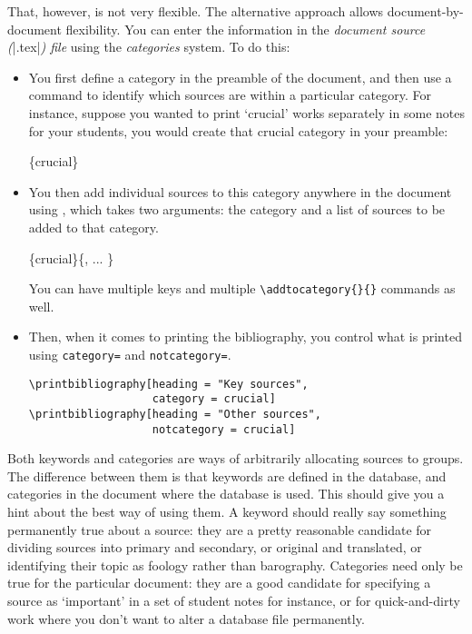That, however, is not very flexible. The alternative approach allows
document-by-document flexibility. You can enter the information in the
\emph{document source (}|.tex|\emph{) file} using the
\emph{categories} system. To do this:
\begin{itemize}
\item You first define a category in the preamble of the document, and
  then use a command to identify which sources are within a particular
  category. For instance, suppose you wanted to print `crucial' works
  separately in some notes for your students, you would create that
  crucial category in your preamble:
  \begin{pseudoverb}
    \centering
    \{crucial\}
  \end{pseudoverb}

\item You then add individual sources to this category anywhere in the
  document using , which takes two arguments: the
  category and a list of sources to be added to that category.

  \begin{pseudoverb}
    \centering
    \{crucial\}\{, ... \}
  \end{pseudoverb}

You can have multiple keys and multiple
\texttt{\textbackslash{}addtocategory\{\}\{\}} commands as well.

\item Then, when it comes to printing the bibliography, you control what is
printed using \texttt{category=} and
\texttt{notcategory=}.
\begin{Verbatim}
\printbibliography[heading = "Key sources",
                   category = crucial]
\printbibliography[heading = "Other sources",
                   notcategory = crucial]
\end{Verbatim}
\end{itemize}

Both keywords and categories are ways of arbitrarily allocating
sources to groups. The difference between them is that keywords are
defined in the database, and categories in the document where the
database is used. This should give you a hint about the best way of
using them. A keyword should really say something permanently true
about a source: they are a pretty reasonable candidate for dividing
sources into primary and secondary, or original and translated, or
identifying their topic as foology rather than barography. Categories
need only be true for the particular document: they are a good
candidate for specifying a source as `important' in a set of student
notes for instance, or for quick-and-dirty work where you don't want
to alter a database file permanently.

